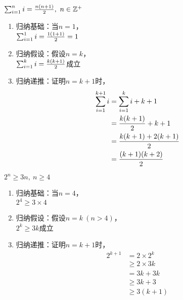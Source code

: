 \begin{tcolorbox}
	$ \sum_{i=1}^{n} i = {n(n+1) \over 2},\ n \in \mathbb{Z^+} $
	\begin{enumerate}
		\item 归纳基础：当$ n = 1 $，\\
		      $ \sum_{i=1}^{1} i = {1(1+1) \over 2} = 1 $

		\item 归纳假设：假设$ n = k $，\\
		      $ \sum_{i=1}^{k} i = {k(k+1) \over 2} $成立

		\item 归纳递推：证明$ n = k + 1 $时，
		      \begin{align*}
			      \sum_{i=1}^{k+1} i & = \sum_{i=1}^{k} i + k + 1  \\
			                         & = {k(k+1) \over 2} + k + 1  \\
			                         & = {k(k+1) + 2(k+1) \over 2} \\
			                         & = {(k+1)(k+2) \over 2}
		      \end{align*}
	\end{enumerate}
\end{tcolorbox}

\begin{tcolorbox}
	$ 2^n \ge 3n,\ n \ge 4 $
	\begin{enumerate}
		\item 归纳基础：当$ n = 4 $，\\
		      $ 2^4 \ge 3 \times 4 $

		\item 归纳假设：假设$ n = k\ (n > 4) $，\\
		      $ 2^k \ge 3k $成立

		\item 归纳递推：证明$ n = k + 1 $时，
		      \begin{align*}
			      2^{k+1} & = 2 \times 2^k  \\
			              & \ge 2 \times 3k \\
			              & = 3k + 3k       \\
			              & \ge 3k + 3      \\
			              & \ge 3(k+1)
		      \end{align*}
	\end{enumerate}
\end{tcolorbox}

